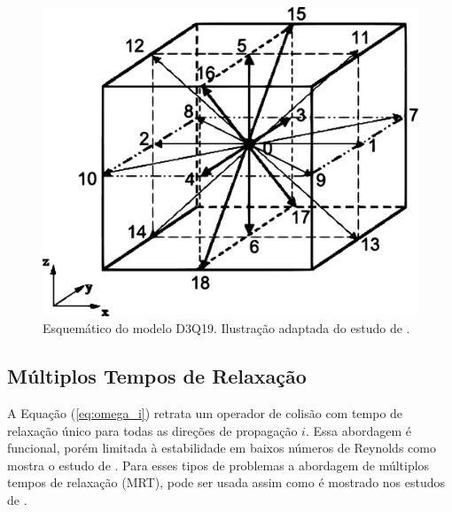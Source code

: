 \begin{figure}[ht!]
\centering
  \includegraphics[width=.75\linewidth]{figuras/d3q19.pdf}
  \caption[Esquemático do D3Q19]{Esquemático do modelo D3Q19. Ilustração adaptada do estudo de .}
  \label{fig:d3q19}
\end{figure}

\newpage
\subsection{Múltiplos Tempos de Relaxação}

A Equação (\ref{eq:omega_i}) retrata um operador de colisão com tempo de relaxação único para todas as direções de propagação $i$. Essa abordagem é funcional, porém limitada à estabilidade em baixos números de Reynolds como mostra o estudo de . Para esses tipos de problemas a abordagem de múltiplos tempos de relaxação (MRT), pode ser usada assim como é mostrado nos estudos de .

